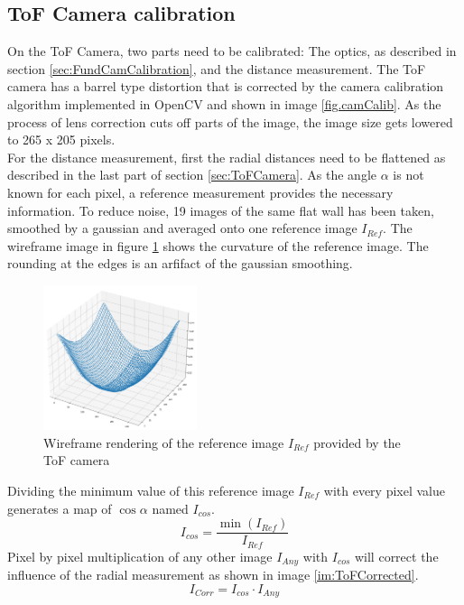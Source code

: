 \subsection{ToF Camera calibration}
\label{sec:ToFCalibration}
On the ToF Camera, two parts need to be calibrated: The optics, as described in section \ref{sec:FundCamCalibration}, and the distance measurement. The ToF camera has a barrel type distortion that is corrected by the camera calibration algorithm implemented in OpenCV\cite{openCVCamCalib} and shown in image \ref{fig.camCalib}. As the process of lens correction cuts off parts of the image, the image size gets lowered to 265 x 205 pixels.\\
For the distance measurement, first the radial distances need to be flattened as described in the last part of section \ref{sec:ToFCamera}. As the angle $\alpha$ is not known for each pixel, a reference measurement provides the necessary information. To reduce noise, 19 images of the same flat wall has been taken, smoothed by a gaussian and averaged onto one reference image $I_{Ref}$. The wireframe image in figure \ref{im:ToFRaw} shows the curvature of the reference image. The rounding at the edges is an arfifact of the gaussian smoothing.\\
\begin{figure}[H]
    \centering
    \includegraphics[width=0.4\textwidth]{images/raw_tof_radial.png}
    \caption{Wireframe rendering of the reference image $I_{Ref}$ provided by the ToF camera}
    \label{im:ToFRaw}
\end{figure}
Dividing the minimum value of this reference image $I_{Ref}$ with every pixel value generates a map of $\cos \alpha$ named $I_{cos}$.
\begin{equation*}
    I_{cos} = \frac{\min (I_{Ref}) }{I_{Ref}} 
\end{equation*}
Pixel by pixel multiplication of any other image $I_{Any}$ with $I_{cos}$ will correct the influence of the radial measurement as shown in image \ref{im:ToFCorrected}. 
\begin{equation*}
    I_{Corr} = I_{cos}\cdot I_{Any}
\end{equation*}
